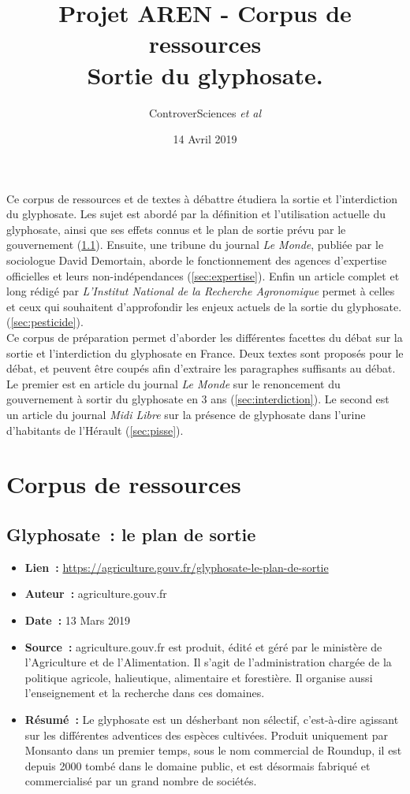 \documentclass[8pt]{article}
\author{ControverSciences\textit{ et al} }
\title{Projet AREN - Corpus de ressources \\   Sortie du glyphosate.}
\date{14 Avril 2019}
\begin{document}
\maketitle

Ce corpus de ressources et de textes à débattre étudiera la sortie et l'interdiction du glyphosate. Les sujet est abordé par la définition et l'utilisation actuelle du glyphosate, ainsi que ses effets connus et le plan de sortie prévu par le gouvernement (\ref{sec:glyphosate}). Ensuite, une tribune du journal \textit{Le Monde}, publiée par le sociologue David Demortain, aborde le fonctionnement des agences d’expertise officielles et leurs non-indépendances (\ref{sec:expertise}). Enfin un article complet et long rédigé par \textit{L'Institut National de la Recherche Agronomique} permet à celles et ceux qui souhaitent d'approfondir les enjeux actuels de la sortie du glyphosate. (\ref{sec:pesticide}).\\


Ce corpus de préparation permet d'aborder les différentes facettes du débat sur la sortie et l'interdiction du glyphosate en France. Deux textes sont proposés pour le débat, et peuvent être coupés afin d'extraire les paragraphes suffisants au débat. Le premier est en article du journal \textit{Le Monde} sur le renoncement du gouvernement à sortir du glyphosate en 3 ans (\ref{sec:interdiction}). Le second est un article du journal \textit{Midi Libre} sur la présence de glyphosate dans l'urine d'habitants de l’Hérault (\ref{sec:pisse}). 

\tableofcontents
\newpage
\section{Corpus de ressources}
\subsection{Glyphosate~: le plan de sortie}
\label{sec:glyphosate}

\begin{itemize}
	\item \textbf{Lien~: }  \url{https://agriculture.gouv.fr/glyphosate-le-plan-de-sortie} 
	\item \textbf{Auteur~: } agriculture.gouv.fr
	\item \textbf{Date~: } 13 Mars 2019 
	\item \textbf{Source~: } agriculture.gouv.fr est produit, édité et géré par le ministère de l’Agriculture et de l'Alimentation. Il s'agit de l’administration chargée de la politique agricole, halieutique, alimentaire et forestière. Il organise aussi l’enseignement et la recherche dans ces domaines.
	\item \textbf{Résumé~: } Le glyphosate est un désherbant non sélectif, c'est-à-dire agissant sur les différentes adventices des espèces cultivées. Produit uniquement par Monsanto dans un premier temps, sous le nom commercial de Roundup, il est depuis 2000 tombé dans le domaine public, et est désormais fabriqué et commercialisé par un grand nombre de sociétés.
\end{itemize}
\end{document}
